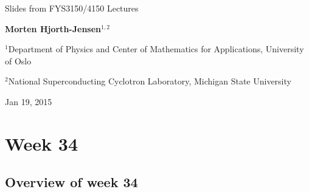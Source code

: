 \documentclass[%
twoside,                 %
final,                   %
10pt]{article}
\begin{document}




\thispagestyle{empty}

\begin{center}
{\LARGE\bf
\begin{spacing}{1.25}
Slides from FYS3150/4150 Lectures
\end{spacing}
}
\end{center}


\begin{center}
{\bf Morten Hjorth-Jensen${}^{1, 2}$} \\ [0mm]
\end{center}

    \begin{center}
\centerline{{\small ${}^1$Department of Physics and Center of Mathematics for Applications, University of Oslo}}
\centerline{{\small ${}^2$National Superconducting Cyclotron Laboratory, Michigan State University}}
\end{center}
    

\begin{center} %
Jan 19, 2015
\end{center}

\vspace{1cm}


\section*{Week 34}

\subsection*{Overview of week 34}


\end{document}
